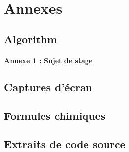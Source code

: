 \appendix
\chapter{Annexes}

\section{Algorithm}


\subsubsection{Annexe 1 : Sujet de stage}
\section{Captures d'écran}

\section{Formules chimiques}

\section{Extraits de code source}